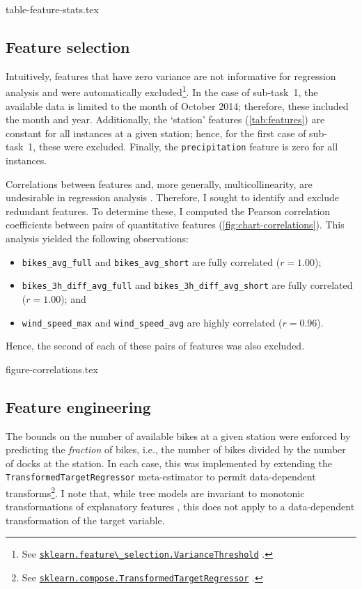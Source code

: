 \documentclass[11pt]{extarticle}
\newcommand{\sklearn}[1]{
  \href{https://scikit-learn.org/stable/modules/generated/sklearn.#1.html}{\lstinline|sklearn.#1|}
}
\newcommand{\windspeedmax}{wind\_speed\_max}
\newcommand{\windspeedavg}{wind\_speed\_avg}
\newcommand{\bikesavgfull}{bikes\_avg\_full}
\newcommand{\bikesavgshort}{bikes\_avg\_short}
\newcommand{\bikeshdiffavgfull}{bikes\_3h\_diff\_avg\_full}
\newcommand{\bikeshdiffavgshort}{bikes\_3h\_diff\_avg\_short}
\begin{document}
{table-feature-stats.tex}

\subsection{Feature selection}
\label{sec:feature-selection}

Intuitively, features that have zero variance are not informative for regression
analysis and were automatically
excluded\footnote{See \sklearn{feature\_selection.VarianceThreshold}.}.
In the case of sub-task~1, the available data is limited to the month of October 2014; therefore, these included the month and year.
Additionally, the `station' features (\cref{tab:features}) are constant for all
instances at a given station; hence, for the first case of sub-task~1, these were
excluded.
Finally, the \texttt{precipitation} feature is zero for all instances.

Correlations between features and, more generally, multicollinearity, are undesirable in regression analysis \parencite{Alin2010}.
Therefore, I sought to identify and exclude redundant features.
To determine these, I computed the Pearson correlation coefficients between pairs of quantitative features (\cref{fig:chart-correlations}).
This analysis yielded the following observations:
\begin{itemize}
  \item \texttt{\bikesavgfull} and \texttt{\bikesavgshort} are fully correlated ($r = 1.00$);
  \item \texttt{\bikeshdiffavgfull} and \texttt{\bikeshdiffavgshort} are fully correlated ($r  = 1.00$); and
  \item \texttt{\windspeedmax} and \texttt{\windspeedavg} are highly correlated ($r = 0.96$).
\end{itemize}
Hence, the second of each of these pairs of features was also excluded.

{figure-correlations.tex}

\subsection{Feature engineering}
\label{sec:feature-engineering}

The bounds on the number of available bikes at a given station were enforced by
predicting the \emph{fraction} of bikes, i.e., the number of bikes divided by the number
of docks at the station.
In each case, this was implemented by extending the \texttt{TransformedTargetRegressor}
meta-estimator to permit data-dependent
transforms\footnote{See \sklearn{compose.TransformedTargetRegressor}.}.
I note that, while tree models are invariant to monotonic transformations of explanatory
features \parencite[e.g.,][3184]{Death2000}, this does not apply to a data-dependent
transformation of the target variable.
\end{document}
